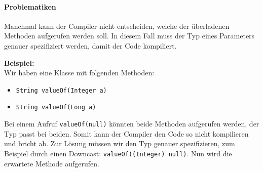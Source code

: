 	\paragraph{Problematiken}
		Manchmal kann der Compiler nicht entscheiden, welche der überladenen Methoden aufgerufen werden soll. In diesem Fall muss der Typ eines Parameters genauer spezifiziert werden, damit der Code kompiliert.
		
		\textbf{Beispiel:} \\
		Wir haben eine Klasse mit folgenden Methoden:
		\begin{itemize}
			\item \lstinline|String valueOf(Integer a)|
			\item \lstinline|String valueOf(Long a)|
		\end{itemize}
		Bei einem Aufruf \lstinline|valueOf(null)| könnten beide Methoden aufgerufen werden, der Typ passt bei beiden. Somit kann der Compiler den Code so nicht kompilieren und bricht ab. Zur Lösung müssen wir den Typ genauer spezifizieren, zum Beispiel durch einen Downcast: \lstinline|valueOf((Integer) null)|. Nun wird die erwartete Methode aufgerufen.

